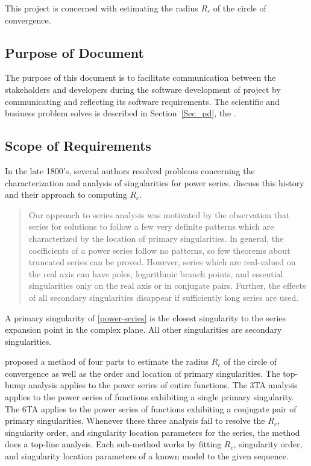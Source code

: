 \documentclass[12pt]{article}
\begin{document}
This project is concerned with estimating the radius $R_c$ of the circle of convergence.

\subsection{Purpose of Document}

The purpose of this document is to facilitate communication between the stakeholders and developers
 during the software development of project 
 by communicating and reflecting its software requirements.
The scientific and business problem  solves is described in
Section~\ref{Sec_pd}, the . 

\subsection{Scope of Requirements}\label{sc:scope}

In the late 1800's, several authors resolved problems
concerning the characterization and analysis of singularities for power series.
\cite{chang1982} discuss this history and their approach to computing $R_c$.

\begin{quote}
Our approach to series analysis was motivated by the observation that series
for solutions to  follow a few very definite patterns which are characterized
by the location of primary singularities. In general, the coefficients of a power
series follow no patterns, so few theorems about truncated series can be proved.
However, series which are real-valued on the real axis can have poles, logarithmic
branch points, and essential singularities only on the real axis or in conjugate pairs.
Further, the effects of all secondary singularities disappear if sufficiently
  long series are used.  \citep[p.~122]{chang1982}
\end{quote}

A primary singularity of \eqref{power-series} is the closest singularity to the series
expansion point in the complex plane. All other singularities are secondary singularities.

\cite{chang1982} proposed a method of four parts to estimate the radius $R_c$ of the circle of convergence
as well as the order and location of primary singularities. The top-hump analysis applies to
the power series of entire functions. The 3TA analysis applies to the power series of
functions exhibiting a single primary singularity. The 6TA applies to the
power series of functions exhibiting a conjugate pair of primary singularities.
Whenever these three analysis fail to resolve the $R_c$, singularity order, and
singularity location parameters for the series, the \cite{chang1982} method does
a top-line analysis. Each \cite{chang1982} sub-method works by fitting $R_c$, singularity order, and
singularity location parameters of a known model to the given sequence.
\end{document}
